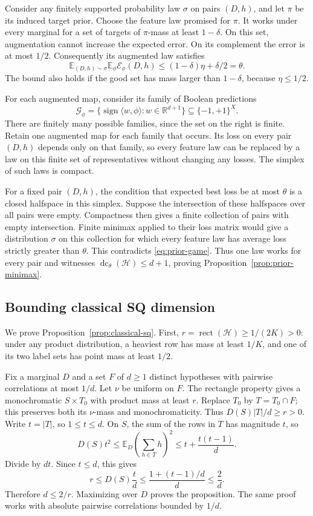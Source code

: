 \documentclass[11pt,letterpaper,pmlr,twoside]{jmlr}
\newcommand{\Hc}{\mathcal H}
\newcommand{\E}{\mathbb E}
\newcommand{\R}{\mathbb R}
\newcommand{\sgn}{\operatorname{sign}}
\newcommand{\dc}{\operatorname{dc}}
\newcommand{\rect}{\operatorname{rect}}
\newcommand{\ip}[2]{\langle #1,#2\rangle}
\begin{document}
Consider any finitely supported probability law $\sigma$ on pairs $(D,h)$, and let $\pi$ be its induced target prior. Choose the feature law promised for $\pi$. It works under every marginal for a set of targets of $\pi$-mass at least $1-\delta$. On this set, augmentation cannot increase the expected error. On its complement the error is at most $1/2$. Consequently its augmented law satisfies
\begin{equation}
 \E_{(D,h)\sim\sigma}\E_\phi\mathcal E_\phi(D,h)
 \le (1-\delta)\eta+\delta/2=\theta.
 \label{eq:prior-game}
\end{equation}
The bound also holds if the good set has mass larger than $1-\delta$, because $\eta\le1/2$.

For each augmented map, consider its family of Boolean predictions
\[
 \mathcal G_\phi=\{\sgn\ip w\phi:w\in\R^{d+1}\}\subseteq\{-1,+1\}^{X}.
\]
There are finitely many possible families, since the set on the right is finite. Retain one augmented map for each family that occurs. Its loss on every pair $(D,h)$ depends only on that family, so every feature law can be replaced by a law on this finite set of representatives without changing any losses. The simplex of such laws is compact.

For a fixed pair $(D,h)$, the condition that expected best loss be at most $\theta$ is a closed halfspace in this simplex. Suppose the intersection of these halfspaces over all pairs were empty. Compactness then gives a finite collection of pairs with empty intersection. Finite minimax applied to their loss matrix would give a distribution $\sigma$ on this collection for which every feature law has average loss strictly greater than $\theta$. This contradicts \eqref{eq:prior-game}. Thus one law works for every pair and witnesses $\dc_\theta(\Hc)\le d+1$, proving Proposition~\ref{prop:prior-minimax}.

\subsection{Bounding classical SQ dimension}
We prove Proposition~\ref{prop:classical-sq}. First, $r=\rect(\Hc)\ge1/(2K)>0$: under any product distribution, a heaviest row has mass at least $1/K$, and one of its two label sets has point mass at least $1/2$.

Fix a marginal $D$ and a set $F$ of $d\ge1$ distinct hypotheses with pairwise correlations at most $1/d$. Let $\nu$ be uniform on $F$. The rectangle property gives a monochromatic $S\times T_0$ with product mass at least $r$. Replace $T_0$ by $T=T_0\cap F$; this preserves both its $\nu$-mass and monochromaticity. Thus $D(S)|T|/d\ge r>0$. Write $t=|T|$, so $1\le t\le d$. On $S$, the sum of the rows in $T$ has magnitude $t$, so
\[
 D(S)t^2
 \le\E_D\left(\sum_{h\in T}h\right)^2
 \le t+\frac{t(t-1)}d.
\]
Divide by $dt$. Since $t\le d$, this gives
\[
 r\le D(S)\frac td
 \le\frac{1+(t-1)/d}{d}\le\frac2d.
\]
Therefore $d\le2/r$. Maximizing over $D$ proves the proposition. The same proof works with absolute pairwise correlations bounded by $1/d$.
\end{document}
